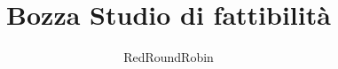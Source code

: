 

\author{RedRoundRobin}
\title{Bozza Studio di fattibilità} 



\maketitle
\tableofcontents  
\newpage

 
